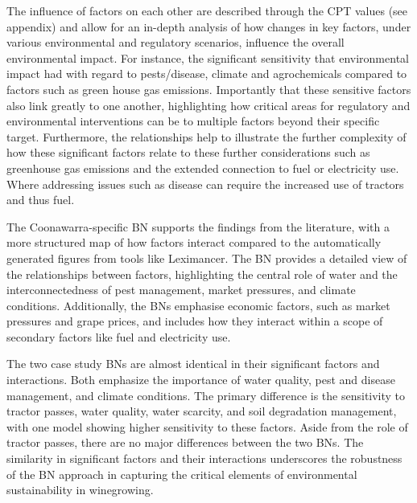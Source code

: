 The influence of factors on each other are described through the CPT values (see appendix) and allow for an in-depth analysis of how changes in key factors, under various environmental and regulatory scenarios, influence the overall environmental impact. For instance, the significant sensitivity that environmental impact had with regard to pests/disease, climate and agrochemicals compared to factors such as green house gas emissions. Importantly that these sensitive factors also link greatly to one another, highlighting how critical areas for regulatory and environmental interventions can be to multiple factors beyond their specific target. Furthermore, the relationships help to illustrate the further complexity of how these significant factors relate to these further considerations such as greenhouse gas emissions and the extended connection to fuel or electricity use. Where addressing issues such as disease can require the increased use of tractors and thus fuel.

The Coonawarra-specific BN supports the findings from the literature, with a more structured map of how factors interact compared to the automatically generated figures from tools like Leximancer. The BN provides a detailed view of the relationships between factors, highlighting the central role of water and the interconnectedness of pest management, market pressures, and climate conditions. Additionally, the BNs emphasise economic factors, such as market pressures and grape prices, and includes how they interact within a scope of secondary factors like fuel and electricity use.


The two case study BNs are almost identical in their significant factors and interactions. Both emphasize the importance of water quality, pest and disease management, and climate conditions. The primary difference is the sensitivity to tractor passes, water quality, water scarcity, and soil degradation management, with one model showing higher sensitivity to these factors. Aside from the role of tractor passes, there are no major differences between the two BNs. The similarity in significant factors and their interactions underscores the robustness of the BN approach in capturing the critical elements of environmental sustainability in winegrowing.

